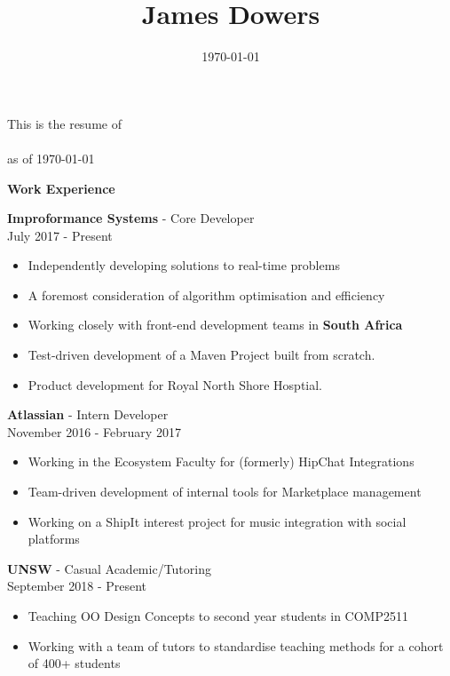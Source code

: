 \documentclass[a4paper]{article}
\title{\textbf{James Dowers}}
\date{\today}
\newcommand{\minititle}[1]{{\Large \begin{center} \textbf{#1} \end{center}} \vspace{0.2cm}}
\newcommand{\resumeEntry}[3]{{\large \textbf{#1} - #2} \\ \small{#3} }
\begin{document}
 

\begin{center}
    This is the resume of \\
     \\
    \vspace{0.2cm}
    as of \today
\end{center}
\begin{minipage}[t]{0.7\linewidth}   
    {
        \minititle{Work Experience}
        \resumeEntry{Improformance Systems}{Core Developer}{July 2017 - Present}
        \begin{itemize}
            \setlength\itemsep{0.03cm}
            \item Independently developing solutions to real-time problems
            \item A foremost consideration of algorithm optimisation and efficiency
            \item Working closely with front-end development teams in  \textbf{South Africa}
            \item Test-driven development of a Maven Project built from scratch.
            \item Product development for Royal North Shore Hosptial.
        \end{itemize}
        \vspace{0.3cm}
        \resumeEntry{Atlassian}{Intern Developer}{November 2016 - February 2017}
        \begin{itemize}
            \setlength\itemsep{0.03cm}
            \item Working in the Ecosystem Faculty for (formerly) HipChat Integrations
            \item Team-driven development of internal tools for Marketplace management
            \item Working on a ShipIt interest project for music integration with social platforms
        \end{itemize}
        \vspace{0.3cm}
        \resumeEntry{UNSW}{Casual Academic/Tutoring}{September 2018 - Present}
        \begin{itemize}
            \setlength\itemsep{0.03cm}
            \item Teaching OO Design Concepts to second year students in COMP2511
            \item Working with a team of tutors to standardise teaching methods for a cohort of 400+ students

\end{itemize}}
\end{minipage}
\end{document}
